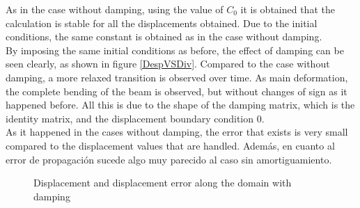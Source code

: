 \documentclass[a4paper, 10pt]{article}
\begin{document}
As in the case without damping, using the value of $C_0$ it is obtained that the calculation is stable for all the displacements obtained. Due to the initial conditions, the same constant is obtained as in the case without damping.\\



By imposing the same initial conditions as before, the effect of damping can be seen clearly, as shown in figure \ref{DespVSDiv}. Compared to the case without damping, a more relaxed transition is observed over time. As main deformation, the complete bending of the beam is observed, but without changes of sign as it happened before. All this is due to the shape of the damping matrix, which is the identity matrix, and the displacement boundary condition 0.\\

As it happened in the cases without damping, the error that exists is very small compared to the displacement values that are handled. Además, en cuanto al error de propagación sucede algo muy parecido al caso sin amortiguamiento.




\begin{figure}
 \centering
 \caption{Displacement and displacement error along the domain with damping}
 \label{DespVSDivAmort2}
\end{figure}
\end{document}
